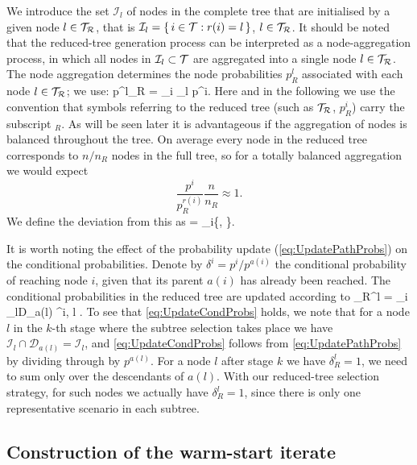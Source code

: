 We introduce the set $\mathcal{I}_l$ of nodes in the complete tree 
that are initialised by a given node $l\in\mathcal{T}_\mathcal{R}$, that is
$\mathcal{I}_l = \{\, i \in \mathcal{T} : r(i) = l \,\}$, $l \in \mathcal{T}_\mathcal{R}$.
It should be noted that the reduced-tree generation process can be
interpreted as a node-aggregation process, in which all nodes in
$\mathcal{I}_l\subset\mathcal{T}$ are aggregated into a single node $l\in\mathcal{T}_\mathcal{R}$.
The node aggregation determines the node probabilities $p_R^l$ associated
with each node $l\in\mathcal{T}_\mathcal{R}$; we use:
\be  \label{eq:UpdatePathProbs}
  p^l_R = \sum_{i \in {}_l} p^i.
\ee
Here and in the following we use the convention that symbols referring
to the reduced tree (such as $\mathcal{T}_\mathcal{R}$, $p_R^i$) carry the subscript $_R$.
As will be seen later it is advantageous if the aggregation of nodes
is balanced throughout the tree. On average every node in the reduced
tree corresponds to $n/n_R$ nodes in the full tree, so for
a totally balanced aggregation we would expect 
\[
  \frac{p^i}{p_R^{r(i)}}\frac{n}{n_R}\approx 1.
\]
We define the deviation from this as
\be  \label{eq:rho}
  \rho = \min_{i\in\Ctree}\left\{, 
                                 \right\}.
\ee

It is worth noting the effect of the probability update
(\ref{eq:UpdatePathProbs}) on the conditional probabilities.
Denote by $\delta^i = p^i/p^{a(i)}$ the conditional probability of
reaching node $i$, given that its parent $a(i)$ has already been
reached.
The conditional probabilities in the reduced tree are updated according to
\be  \label{eq:UpdateCondProbs}
  \delta_R^l = \!\!\! \sum_{i \in {}_l\cap D_{a(l)}} \!\!\! \delta^i,
  \quad l \in \Rtree.
\ee
To see that \eqref{eq:UpdateCondProbs} holds, we note that for a node $l$
in the $k$-th stage where the subtree selection takes place we have
$\mathcal{I}_l \cap \mathcal{D}_{a(l)} = \mathcal{I}_l$, and
\eqref{eq:UpdateCondProbs} follows from \eqref{eq:UpdatePathProbs}
by dividing through by $p^{a(l)}$.
For a node $l$ after stage $k$ we have $\delta_R^l = 1$, we need to sum
only over the descendants of $a(l)$.
With our reduced-tree selection strategy, for such nodes we actually
have $\delta_R^l = 1$, since there is only one representative scenario
in each subtree.

%
%
\subsection{Construction of the warm-start iterate}
\label{sec:Construction}

